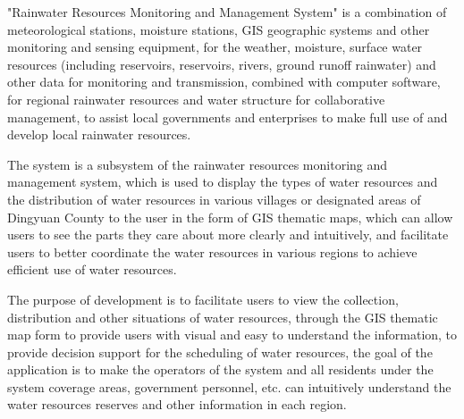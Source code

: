 "Rainwater Resources Monitoring and Management System" is a combination of meteorological stations, moisture stations, GIS geographic systems and other monitoring and sensing equipment, for the weather, moisture, surface water resources (including reservoirs, reservoirs, rivers, ground runoff rainwater) and other data for monitoring and transmission, combined with computer software, for regional rainwater resources and water structure for collaborative management, to assist local governments and enterprises to make full use of and develop local rainwater resources.

The system is a subsystem of the rainwater resources monitoring and management system, which is used to display the types of water resources and the distribution of water resources in various villages or designated areas of Dingyuan County to the user in the form of GIS thematic maps, which can allow users to see the parts they care about more clearly and intuitively, and facilitate users to better coordinate the water resources in various regions to achieve efficient use of water resources.

The purpose of development is to facilitate users to view the collection, distribution and other situations of water resources, through the GIS thematic map form to provide users with visual and easy to understand the information, to provide decision support for the scheduling of water resources, the goal of the application is to make the operators of the system and all residents under the system coverage areas, government personnel, etc. can intuitively understand the water resources reserves and other information in each region.